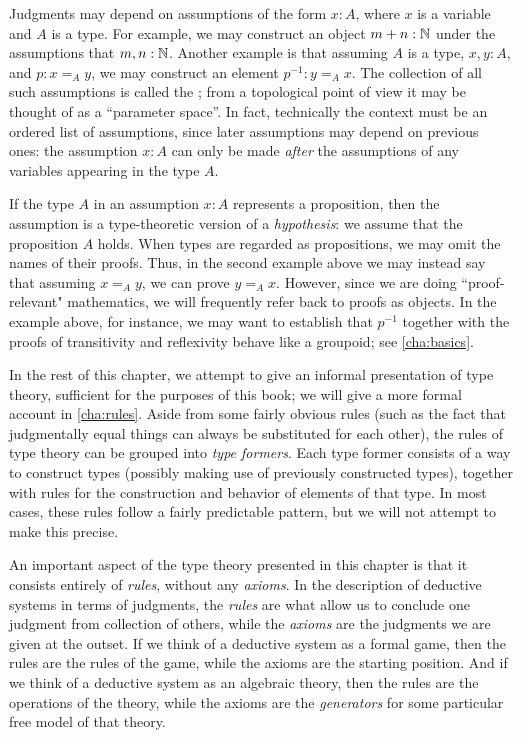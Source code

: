 Judgments may depend on assumptions of the form $x:A$, where $x$ is a variable and $A$ is a type.
For example, we may construct an object $m + n : \mathbb{N}$ under the assumptions that $m,n : \mathbb{N}$.
Another example is that assuming $A$ is a type, $x,y : A$, and $p : x =_A y$, we may construct an element $p^{-1} : y =_A x$.
The collection of all such assumptions is called the ; from a topological point of view it may be thought of as a ``parameter space''.
In fact, technically the context must be an ordered list of assumptions, since later assumptions may depend on previous ones: the assumption $x:A$ can only be made \emph{after} the assumptions of any variables appearing in the type $A$.

If the type $A$ in an assumption $x:A$ represents a proposition, then the assumption is a type-theoretic version of a \emph{hypothesis}: we assume that the proposition $A$ holds.
When types are regarded as propositions, we may omit the names of their proofs.
Thus, in the second example above we may instead say that assuming $x =_A y$, we can prove $y =_A x$.
However, since we are doing ``proof-relevant" mathematics, we will frequently refer back to proofs as objects.
In the example above, for instance, we may want to establish that $p^{-1}$ together with the proofs of transitivity and reflexivity behave like a groupoid; see \autoref{cha:basics}.

In the rest of this chapter, we attempt to give an informal presentation of type theory, sufficient for the purposes of this book; we will give a more formal account in \autoref{cha:rules}.
Aside from some fairly obvious rules (such as the fact that judgmentally equal things can always be substituted for each other), the rules of type theory can be grouped into \emph{type formers}.
Each type former consists of a way to construct types (possibly making use of previously constructed types), together with rules for the construction and behavior of elements of that type.
In most cases, these rules follow a fairly predictable pattern, but we will not attempt to make this precise.

An important aspect of the type theory presented in this chapter is that it consists entirely of \emph{rules}, without any \emph{axioms}.
In the description of deductive systems in terms of judgments, the \emph{rules} are what allow us to conclude one judgment from collection of others, while the \emph{axioms} are the judgments we are given at the outset.
If we think of a deductive system as a formal game, then the rules are the rules of the game, while the axioms are the starting position.
And if we think of a deductive system as an algebraic theory, then the rules are the operations of the theory, while the axioms are the \emph{generators} for some particular free model of that theory.

